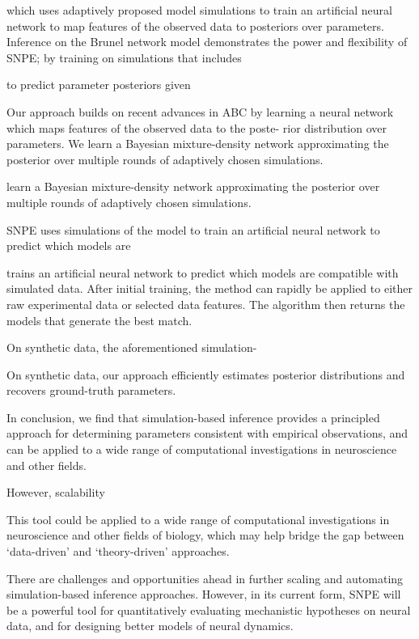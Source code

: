 which uses adaptively proposed model simulations to train an artificial neural network to map features of the observed data to posteriors over parameters. Inference on the Brunel network model demonstrates the power and flexibility of SNPE; by training on simulations that includes 

to predict parameter posteriors given 

Our approach builds on recent advances in ABC by learning a neural network which maps features of the observed data to the poste- rior distribution over parameters. We learn a Bayesian mixture-density network approximating the posterior over multiple rounds of adaptively chosen simulations.




learn a Bayesian mixture-density network approximating the posterior over multiple rounds of adaptively chosen simulations.


SNPE uses simulations of the model to train an artificial neural network to predict which models are 


trains an artificial neural network to predict which models are compatible with simulated data. After initial training, the method can rapidly be applied to either raw experimental data or selected data features. The algorithm then returns the models that generate the best match. 

On synthetic data, the aforementioned simulation-

On synthetic data, our approach efficiently estimates posterior distributions and recovers ground-truth parameters.

In conclusion, we find that simulation-based inference provides a principled approach for determining parameters consistent with empirical observations, and can be applied to a wide range of computational investigations in neuroscience and other fields. 

However, scalability

This tool could be applied to a wide range of computational investigations in neuroscience and other fields of biology, which may help bridge the gap between ‘data-driven’ and ‘theory-driven’ approaches.

There are challenges and opportunities ahead in further scaling and automating simulation-based inference approaches. However, in its current form, SNPE will be a powerful tool for quantitatively evaluating mechanistic hypotheses on neural data, and for designing better models of neural dynamics.

